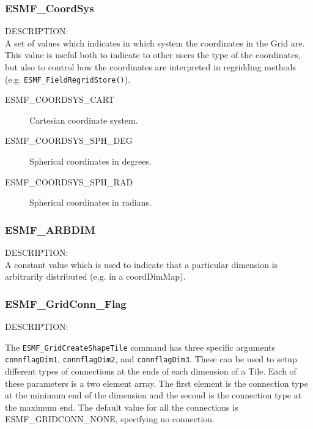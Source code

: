 
\subsubsection{ESMF\_CoordSys}
\label{sec:opt:coordsys}
{\sf DESCRIPTION:\\}
 A set of values which indicates in which system the coordinates in the Grid are. This value is useful both to indicate to 
other users the type of the coordinates, but also to control how the coordinates are interpreted in regridding methods 
(e.g. {\tt ESMF\_FieldRegridStore()}).

\medskip
\begin{description}
\item [ESMF\_COORDSYS\_CART] Cartesian coordinate system. 

\item [ESMF\_COORDSYS\_SPH\_DEG] Spherical coordinates in degrees.

\item [ESMF\_COORDSYS\_SPH\_RAD] Spherical coordinates in radians.

\end{description}


\subsubsection{ESMF\_ARBDIM}
\label{sec:opt:arbdim}
{\sf DESCRIPTION:\\}
A constant value which is used to indicate that a particular dimension is arbitrarily distributed (e.g. in a coordDimMap). 



\subsubsection{ESMF\_GridConn\_Flag}
\label{sec:opt:gridconn}
{\sf DESCRIPTION:\\}
\begin{sloppypar}
The {\tt ESMF\_GridCreateShapeTile} command has three specific arguments
{\tt connflagDim1}, {\tt connflagDim2}, and {\tt connflagDim3}. These can be used
to setup different types of connections at the ends of each dimension
of a Tile.  Each of these parameters is a two element array. The first
element is the connection type at the minimum end of the dimension
and the second is the connection type at the maximum end. The default
value for all the connections is ESMF\_GRIDCONN\_NONE, specifying no
connection.
\end{sloppypar}

